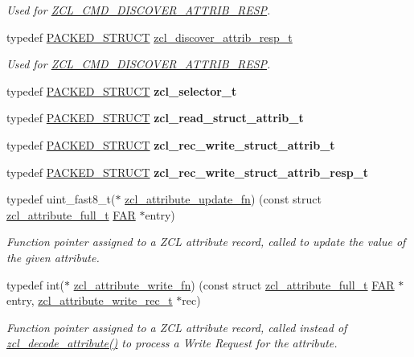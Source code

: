 \begin{DoxyCompactItemize}
\begin{DoxyCompactList}\small\item\em Used for \hyperlink{group__zcl_gae15c30229c1d8a8cdee1bd92b2cc6a15}{Z\+C\+L\+\_\+\+C\+M\+D\+\_\+\+D\+I\+S\+C\+O\+V\+E\+R\+\_\+\+A\+T\+T\+R\+I\+B\+\_\+\+R\+E\+SP}. \end{DoxyCompactList}\item 
typedef \hyperlink{group___s_x_a_ga4233297bd31be5c273d4fb0758cc54d7}{P\+A\+C\+K\+E\+D\+\_\+\+S\+T\+R\+U\+CT} \hyperlink{group__zcl_ga6e35b82b4bc8167f8d45d7d514e3cfda}{zcl\+\_\+discover\+\_\+attrib\+\_\+resp\+\_\+t}
\begin{DoxyCompactList}\small\item\em Used for \hyperlink{group__zcl_gae15c30229c1d8a8cdee1bd92b2cc6a15}{Z\+C\+L\+\_\+\+C\+M\+D\+\_\+\+D\+I\+S\+C\+O\+V\+E\+R\+\_\+\+A\+T\+T\+R\+I\+B\+\_\+\+R\+E\+SP}. \end{DoxyCompactList}\item 
typedef \hyperlink{group___s_x_a_ga4233297bd31be5c273d4fb0758cc54d7}{P\+A\+C\+K\+E\+D\+\_\+\+S\+T\+R\+U\+CT} {\bfseries zcl\+\_\+selector\+\_\+t}
\item 
typedef \hyperlink{group___s_x_a_ga4233297bd31be5c273d4fb0758cc54d7}{P\+A\+C\+K\+E\+D\+\_\+\+S\+T\+R\+U\+CT} {\bfseries zcl\+\_\+read\+\_\+struct\+\_\+attrib\+\_\+t}
\item 
typedef \hyperlink{group___s_x_a_ga4233297bd31be5c273d4fb0758cc54d7}{P\+A\+C\+K\+E\+D\+\_\+\+S\+T\+R\+U\+CT} {\bfseries zcl\+\_\+rec\+\_\+write\+\_\+struct\+\_\+attrib\+\_\+t}
\item 
typedef \hyperlink{group___s_x_a_ga4233297bd31be5c273d4fb0758cc54d7}{P\+A\+C\+K\+E\+D\+\_\+\+S\+T\+R\+U\+CT} {\bfseries zcl\+\_\+rec\+\_\+write\+\_\+struct\+\_\+attrib\+\_\+resp\+\_\+t}
\item 
typedef uint\+\_\+fast8\+\_\+t($\ast$ \hyperlink{group__zcl_gace94cfc3f22379fa08a5b8de8c6977f6}{zcl\+\_\+attribute\+\_\+update\+\_\+fn}) (const struct \hyperlink{structzcl__attribute__full__t}{zcl\+\_\+attribute\+\_\+full\+\_\+t} \hyperlink{group__hal_gaef060b3456fdcc093a7210a762d5f2ed}{F\+AR} $\ast$entry)
\begin{DoxyCompactList}\small\item\em Function pointer assigned to a Z\+CL attribute record, called to update the value of the given attribute. \end{DoxyCompactList}\item 
typedef int($\ast$ \hyperlink{group__zcl_ga70fa1740c517a1e49c700cba7cf6b339}{zcl\+\_\+attribute\+\_\+write\+\_\+fn}) (const struct \hyperlink{structzcl__attribute__full__t}{zcl\+\_\+attribute\+\_\+full\+\_\+t} \hyperlink{group__hal_gaef060b3456fdcc093a7210a762d5f2ed}{F\+AR} $\ast$entry, \hyperlink{structzcl__attribute__write__rec__t}{zcl\+\_\+attribute\+\_\+write\+\_\+rec\+\_\+t} $\ast$rec)
\begin{DoxyCompactList}\small\item\em Function pointer assigned to a Z\+CL attribute record, called instead of \hyperlink{group__zcl_ga15bf36dadccd7a045bad7d6f0842e25a}{zcl\+\_\+decode\+\_\+attribute()} to process a Write Request for the attribute. \end{DoxyCompactList}\end{DoxyCompactItemize}

